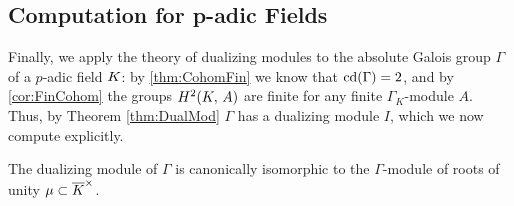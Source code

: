 \documentclass[a4paper, oneside]{memoir}
\begin{document}
\subsection{Computation for p-adic Fields}

Finally, we apply the theory of dualizing modules to the absolute Galois group \(\Gamma\) of a \(p\)-adic field \(K\): by \ref{thm:CohomFin} we know that \(\operatorname{cd}(\Gamma)=2\), and by \ref{cor:FinCohom} the groups \(H^{2}( K, \, A )\) are finite for any finite \(\Gamma_K\)-module $A$. Thus, by Theorem \ref{thm:DualMod} \(\Gamma\) has a dualizing module \(I\), which we now compute explicitly.

\begin{proposition}
    The dualizing module of \(\Gamma\) is canonically isomorphic to the \(\Gamma\)-module of roots of unity \(\mu\subset\overline{K}^\times\).
\end{proposition}
\end{document}

